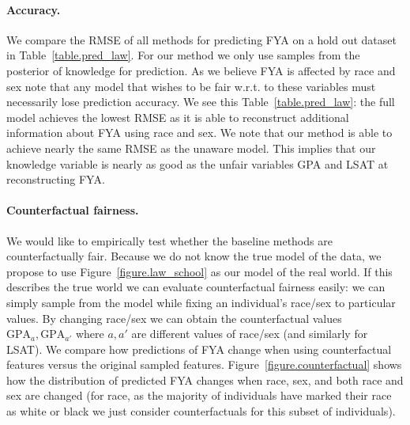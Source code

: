 \paragraph{Accuracy.}
We compare the RMSE of all methods for predicting FYA on a hold out dataset in Table~\ref{table.pred_law}. For our method we only use samples from the posterior of knowledge for prediction. As we believe FYA is affected by race and sex note that any model that wishes to be fair w.r.t. to these variables must necessarily lose prediction accuracy. We see this Table~\ref{table.pred_law}: the full model achieves the lowest RMSE as it is able to reconstruct additional information about FYA using race and sex. We note that our method is able to achieve nearly the same RMSE as the unaware model. This implies that our knowledge variable is nearly as good as the unfair variables GPA and LSAT at reconstructing FYA.


\paragraph{Counterfactual fairness.}
We would like to empirically test whether the baseline methods are counterfactually fair. Because we do not know the true model of the data, we propose to use Figure~\ref{figure.law_school} as our model of the real world. If this describes the true world we can evaluate counterfactual fairness easily: we can simply sample from the model while fixing an individual's race/sex to particular values. By changing race/sex we can obtain the counterfactual values $\mbox{GPA}_a,\mbox{GPA}_{a'}$ where $a,a'$ are different values of race/sex (and similarly for LSAT). We compare how predictions of FYA change when using counterfactual features versus the original sampled features. Figure~\ref{figure.counterfactual} shows how the distribution of predicted FYA changes when race, sex, and both race and sex are changed (for race, as the majority of individuals have marked their race as white or black we just consider counterfactuals for this subset of individuals).


 

